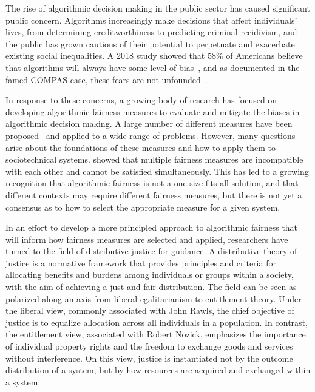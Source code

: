 
The rise of algorithmic decision making in the public sector has caused
significant public concern. Algorithms increasingly make decisions that affect
individuals' lives, from determining creditworthiness to predicting criminal 
recidivism, and the public has grown cautious of their potential to perpetuate
and exacerbate existing social inequalities. A 2018 study showed that 58\% of
Americans believe that algorithms will always have some level of
bias~\citep{Smith_2018}, and as documented in the famed COMPAS case, these fears
are not unfounded~\citep{Angwin_2016}.

In response to these concerns, a growing body of research has focused on
developing algorithmic fairness measures to evaluate and mitigate the biases
in algorithmic decision making. A large number of different measures have been
proposed~\citep{CorbettDavies_2023} and applied to a wide range of problems.
However, many questions arise about the foundations of these measures and how to
apply them to sociotechnical systems. \cite{Chouldechova_2017} showed that
multiple fairness measures are incompatible with each other and cannot be
satisfied simultaneously. This has led to a growing recognition that algorithmic
fairness is not a one-size-fits-all solution, and that different contexts may
require different fairness measures, but there is not yet a consensus as to how
to select the appropriate measure for a given system.

In an effort to develop a more principled approach to algorithmic fairness that
will inform how fairness measures are selected and applied,
researchers have turned to the field of distributive justice for guidance.
A distributive theory of justice is a normative framework that provides
principles and criteria for allocating benefits and burdens among individuals or
groups within a society, with the aim of achieving a just and fair distribution.
The field can be seen as polarized along an axis from liberal egalitarianism to
entitlement theory. Under the liberal view, commonly associated with John Rawls, 
the chief objective of justice is to equalize allocation across all individuals
in a population. In contrast, the entitlement view, associated with Robert
Nozick, emphasizes the importance of individual property rights and the freedom
to exchange goods and services without interference. On this view, justice is
instantiated not by the outcome distribution of a system, but by how resources
are acquired and exchanged within a system.

